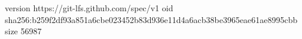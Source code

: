 version https://git-lfs.github.com/spec/v1
oid sha256:b259f2df93a851a6cbe023452b83d936e11d4a6acb38be3965eae61ae8995cbb
size 56987
